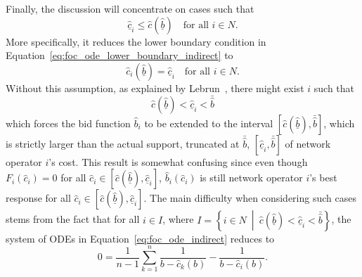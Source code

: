 Finally, the discussion will concentrate on cases such that
\begin{equation}
  \label{eq:simplification_foc_ode_indirect}
  \underline{\hat{c}}_i \leq \hat{c}(\underline{\hat{b}}) \quad\textrm{for all } i\in N.
\end{equation}
 More specifically, it reduces the lower boundary condition in Equation~\eqref{eq:foc_ode_lower_boundary_indirect} to
\begin{equation}
  \label{eq:foc_ode_lower_boundary_reduced_indirect}
  \hat{c}_i(\underline{\hat{b}}) = \underline{\hat{c}}_i \quad\textrm{for all } i\in N.
\end{equation}
 Without this assumption, as explained by Lebrun~\cite{Lebrun2006}, there might exist $i$ such that
\begin{equation}
  \hat{c}(\underline{\hat{b}}) < \underline{\hat{c}}_i < \bar{\hat{b}}
\end{equation}
which forces the bid function $\hat{b}_i$ to be extended to the interval $[\hat{c}(\underline{\hat{b}}), \bar{\hat{b}}]$, which is strictly larger than the actual support, truncated at $\bar{\hat{b}}$, $[\underline{\hat{c}}_i, \bar{\hat{b}}]$ of network operator $i$'s cost. This result is somewhat confusing since even though $F_i(\hat{c}_i) = 0$ for all $\hat{c}_i\in [\hat{c}(\underline{\hat{b}}), \underline{\hat{c}}_i]$, $\hat{b}_i(\hat{c}_i)$ is still network operator $i$'s best response for all $\hat{c}_i\in [\hat{c}(\underline{\hat{b}}), \underline{\hat{c}}_i]$. The main difficulty when considering such cases stems from the fact that for all $i\in I$, where $I = \left\{i\in N \:\middle\vert\: \hat{c}(\underline{\hat{b}}) < \underline{\hat{c}}_i < \bar{\hat{b}} \right\}$, the system of ODEs in Equation~\eqref{eq:foc_ode_indirect} reduces to
\begin{equation}
  \label{eq:foc_reduced_indirect}
  0 = \frac{1}{n-1}\sum_{k=1}^{n}\frac{1}{b - \hat{c}_k(b)} - \frac{1}{b - \hat{c}_i(b)}.
\end{equation}
